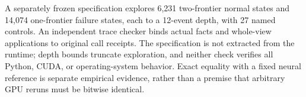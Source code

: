 A separately frozen specification explores 6,231 two-frontier normal
states and 14,074 one-frontier failure states, each to a 12-event depth,
with 27 named controls. An independent trace checker binds actual facts
and whole-view applications to original call receipts. The specification
is not extracted from the runtime; depth bounds truncate exploration,
and neither check verifies all Python, CUDA, or operating-system behavior.
Exact equality with a fixed neural reference is separate empirical evidence,
rather than a premise that arbitrary GPU reruns must be bitwise identical.

